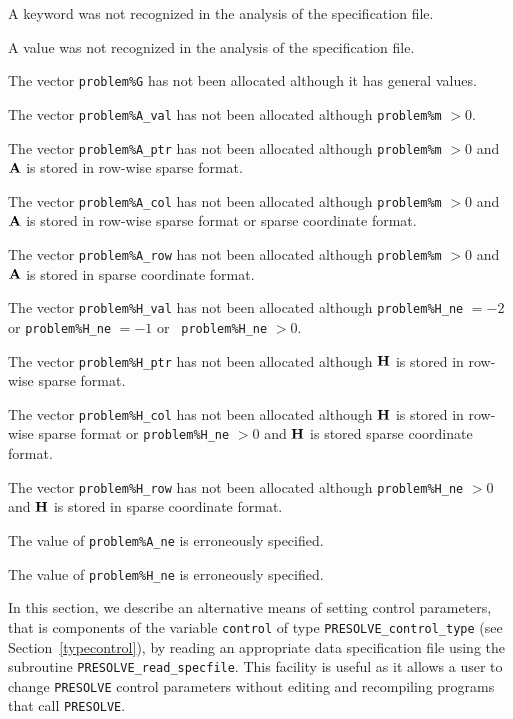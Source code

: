 \documentclass{galahad}
\newcommand{\packagename}{PRESOLVE}
\begin{document}
\begin{description}
 A keyword was not recognized in the analysis of the specification
file. 

 A value was not recognized in the analysis of the specification file.

 The vector {\tt problem\%G} has not been allocated although it
has general values.

 The vector {\tt problem\%A\_val} has not been allocated although
{\tt problem\%m} $> 0$.

 The vector {\tt problem\%A\_ptr} has not been allocated although
{\tt problem\%m} $> 0$ and ${\mathbf{A}}$ is stored in row-wise sparse format.

 The vector {\tt problem\%A\_col} has not been allocated although
{\tt problem\%m} $> 0$ and ${\mathbf{A}}$ is stored in row-wise sparse format
or sparse coordinate format.

 The vector {\tt problem\%A\_row} has not been allocated although
{\tt problem\%m} $> 0$ and ${\mathbf{A}}$ is stored in sparse coordinate format.

 The vector {\tt problem\%H\_val} has not been allocated although
{\tt problem\%H\_ne} $= -2$ or {\tt problem\%H\_ne} $= -1$ or {\tt
problem\%H\_ne} $> 0$.

 The vector {\tt problem\%H\_ptr} has not been allocated although
${\mathbf{H}}$ is stored in row-wise sparse format.

 The vector {\tt problem\%H\_col} has not been allocated although
${\mathbf{H}}$ is stored in row-wise sparse format or {\tt problem\%H\_ne} $> 0$ and
${\mathbf{H}}$ is stored sparse coordinate format. 

 The vector {\tt problem\%H\_row} has not been allocated although
{\tt problem\%H\_ne} $> 0$ and ${\mathbf{H}}$ is stored in sparse coordinate format.

 The value of {\tt problem\%A\_ne} is erroneously specified.

 The value of {\tt problem\%H\_ne} is erroneously specified.

\end{description}


\galfeatures
\noindent In this section, we describe an alternative means of setting 
control parameters, that is components of the variable {\tt control} of type
{\tt \packagename\_control\_type}
(see Section~\ref{typecontrol}), 
by reading an appropriate data specification file using the
subroutine {\tt \packagename\_read\_specfile}. This facility
is useful as it allows a user to change  {\tt \packagename} control parameters 
without editing and recompiling programs that call {\tt \packagename}.
\end{document}
